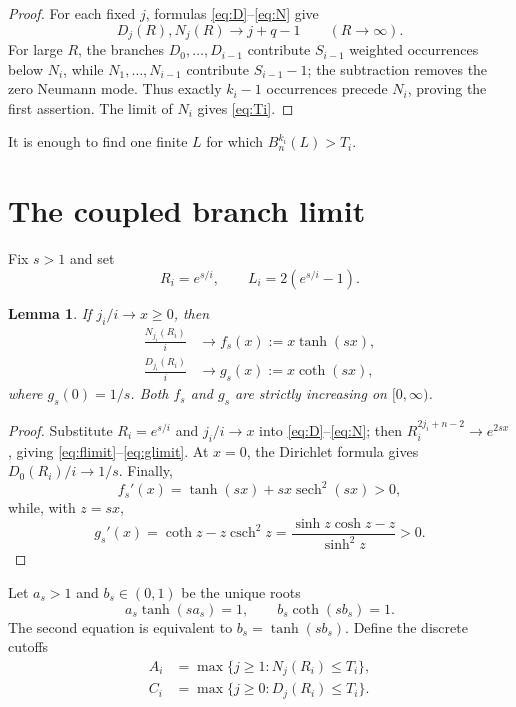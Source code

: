 \documentclass[11pt]{article}
\newtheorem{lemma}[theorem]{Lemma}
\theoremstyle{remark}
\begin{document}
\begin{proof}
For each fixed $j$, formulas \eqref{eq:D}--\eqref{eq:N} give
\[
 D_j(R),N_j(R)\longrightarrow j+q-1
 \qquad(R\to\infty).
\]
For large $R$, the branches $D_0,\ldots,D_{i-1}$ contribute
$S_{i-1}$ weighted occurrences below $N_i$, while
$N_1,\ldots,N_{i-1}$ contribute $S_{i-1}-1$; the subtraction removes the
zero Neumann mode.  Thus exactly $k_i-1$ occurrences precede $N_i$, proving
the first assertion.  The limit of $N_i$ gives \eqref{eq:Ti}.
\end{proof}

It is enough to find one finite $L$ for which
$B_n^{k_i}(L)>T_i$.

\section{The coupled branch limit}

Fix $s>1$ and set
\begin{equation}\label{eq:scale}
 R_i=e^{s/i},
 \qquad
 L_i=2(e^{s/i}-1).
\end{equation}

\begin{lemma}\label{lem:limits}
If $j_i/i\to x\ge0$, then
\begin{align}
 \frac{N_{j_i}(R_i)}{i}&\longrightarrow
 f_s(x):=x\tanh(sx),\label{eq:flimit}\\
 \frac{D_{j_i}(R_i)}{i}&\longrightarrow
 g_s(x):=x\coth(sx),\label{eq:glimit}
\end{align}
where $g_s(0)=1/s$.  Both $f_s$ and $g_s$ are strictly increasing on
$[0,\infty)$.
\end{lemma}

\begin{proof}
Substitute $R_i=e^{s/i}$ and $j_i/i\to x$ into
\eqref{eq:D}--\eqref{eq:N}; then
$R_i^{2j_i+n-2}\to e^{2sx}$, giving
\eqref{eq:flimit}--\eqref{eq:glimit}.  At $x=0$, the Dirichlet formula
gives $D_0(R_i)/i\to1/s$.  Finally,
\[
 f_s'(x)=\tanh(sx)+sx\operatorname{sech}^2(sx)>0,
\]
while, with $z=sx$,
\[
 g_s'(x)=\coth z-z\operatorname{csch}^2z
 =\frac{\sinh z\cosh z-z}{\sinh^2z}>0.
\]
\end{proof}

Let $a_s>1$ and $b_s\in(0,1)$ be the unique roots
\begin{equation}\label{eq:roots}
 a_s\tanh(sa_s)=1,
 \qquad
 b_s\coth(sb_s)=1.
\end{equation}
The second equation is equivalent to $b_s=\tanh(sb_s)$.  Define the
discrete cutoffs
\begin{align}
 A_i&=\max\{j\ge1:N_j(R_i)\le T_i\},\label{eq:Ai}\\
 C_i&=\max\{j\ge0:D_j(R_i)\le T_i\}.\label{eq:Ci}
\end{align}
\end{document}
